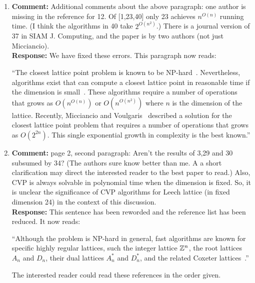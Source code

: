 \documentclass[a4paper,10pt]{article}
\begin{document}
\begin{enumerate}
\item\textbf{Comment:}  
Additional comments about the above paragraph: one author is missing in the reference for 12. Of [1,23,40] only 23 achieves $n^{O(n)}$ running time. (I think the algorithms in 40 take $2^{O(n^2)}$.) There is a journal version of 37 in SIAM J. Computing, and the paper is by two authors (not just Micciancio). 
\\\textbf{Response:}
We have fixed these errors.  This paragraph now reads:

``The closest lattice point problem is known to be NP-hard~\cite{micciancio_hardness_2001, Dinur2003_approximating_CVP_NP_hard,Regev_2004_inappox_lattice_with_preprocessing,feige_inapproximability_2004,Jalden2005_sphere_decoding_complexity}. Nevertheless, algorithms exist that can compute a closest lattice point in reasonable time if the dimension is small~\cite{Pohst_sphere_decoder_1981,Kannan1987_fast_general_np,Agrell2002}.  These algorithms require a number of operations that grows as $O(n^{O(n)})$ or $O(n^{O(n^2)})$ where $n$ is the dimension of the lattice.  Recently, Micciancio and Voulgaris~\cite{MicciancioVoulgaris_deterministic_jv_2013} described a solution for the closest lattice point problem that requires a number of operations that grows as $O(2^{2n})$.  This single exponential growth in complexity is the best known.''

\item\textbf{Comment:}  
page 2, second paragraph: Aren't the results of 3,29 and 30 subsumed by 34? (The authors sure know better than me. A a short clarification may direct the interested reader to the best paper to read.) Also, CVP is always solvable in polynomial time when the dimension is fixed. So, it is unclear the significance of CVP algorithms for Leech lattice (in fixed dimension 24) in the context of this discussion. 
\\\textbf{Response:}
This sentence has been reworded and the reference list has been reduced.  It now reads:

``Although the problem is NP-hard in general, fast algorithms are known for specific highly regular lattices, such the integer lattice ${\mathbb Z}^{n}$, the root lattices $A_n$ and $D_n$, their dual lattices $A_n^*$ and $D_n^*$, and the related Coxeter lattices~\cite[Chap.~4]{SPLAG}\cite{Conway1982FastQuantDec, McKilliam2008, McKilliam2009CoxeterLattices}.''

The interested reader could read these references in the order given. %


\end{enumerate}
\end{document}
